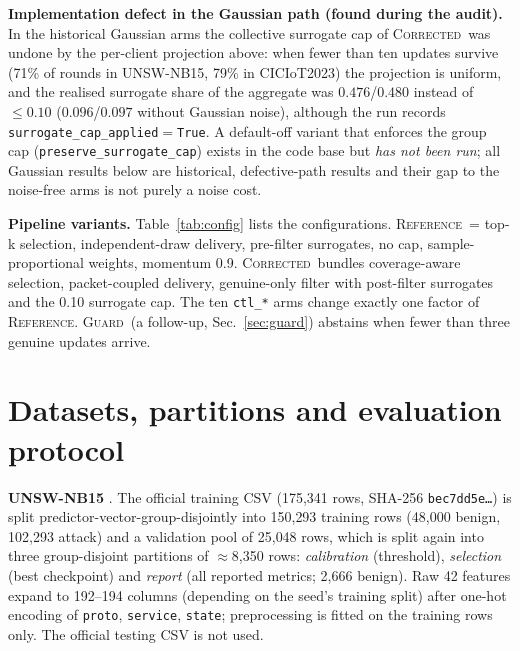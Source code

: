 \documentclass[preprint,12pt,times,numafflabel]{elsarticle}
\newcommand{\RefA}{\textsc{Reference}}
\newcommand{\Cor}{\textsc{Corrected}}
\newcommand{\Guard}{\textsc{Guard}}
\begin{document}
\textbf{Implementation defect in the Gaussian path (found during the audit).} In the historical Gaussian arms the collective surrogate cap of \Cor\ was undone by the per-client projection above: when fewer than ten updates survive (71\% of rounds in UNSW-NB15, 79\% in CICIoT2023) the projection is uniform, and the realised surrogate share of the aggregate was $0.476$/$0.480$ instead of $\le0.10$ ($0.096$/$0.097$ without Gaussian noise), although the run records \texttt{surrogate\_cap\_applied}$=$\texttt{True}. A default-off variant that enforces the group cap (\texttt{preserve\_surrogate\_cap}) exists in the code base but \emph{has not been run}; all Gaussian results below are historical, defective-path results and their gap to the noise-free arms is not purely a noise cost.

\textbf{Pipeline variants.} Table~\ref{tab:config} lists the configurations. \RefA\ = top-k selection, independent-draw delivery, pre-filter surrogates, no cap, sample-proportional weights, momentum 0.9. \Cor\ bundles coverage-aware selection, packet-coupled delivery, genuine-only filter with post-filter surrogates and the 0.10 surrogate cap. The ten \texttt{ctl\_*} arms change exactly one factor of \RefA. \Guard\ (a follow-up, Sec.~\ref{sec:guard}) abstains when fewer than three genuine updates arrive.

\begin{table}[t]\centering\scriptsize
\caption{Arm configurations (UNSW-NB15 configs; CICIoT2023 differs only in the dataset block). Source: \texttt{configs/phase6c/}, generated into \texttt{docs/phase8/tables/T6\_baseline\_configuration\_matrix\_phase6c.csv}. All attack arms use 20\% sign-flip (scale 5) and failure probability 0.1 unless noted.}\label{tab:config}
\resizebox{\textwidth}{!}{}
\end{table}

\section{Datasets, partitions and evaluation protocol}
\label{sec:data}
\textbf{UNSW-NB15} \cite{moustafa2015unsw}. The official training CSV (175{,}341 rows, SHA-256 \texttt{bec7dd5e\dots}) is split predictor-vector-group-disjointly into 150{,}293 training rows (48{,}000 benign, 102{,}293 attack) and a validation pool of 25{,}048 rows, which is split again into three group-disjoint partitions of $\approx$8{,}350 rows: \emph{calibration} (threshold), \emph{selection} (best checkpoint) and \emph{report} (all reported metrics; 2{,}666 benign). Raw 42 features expand to 192--194 columns (depending on the seed's training split) after one-hot encoding of \texttt{proto}, \texttt{service}, \texttt{state}; preprocessing is fitted on the training rows only. The official testing CSV is not used.
\end{document}
